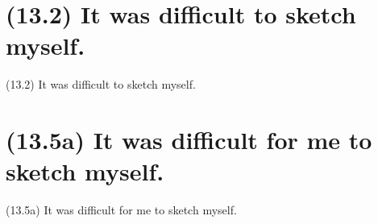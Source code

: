 \documentclass{article}
\begin{document}
\clearpage

%
%

\section*{(13.2) It was difficult to sketch myself.}

\bigbreak
\begin{enumerate*}
\item[(13.2)] It was difficult to sketch myself.
\end{enumerate*}
\bigbreak

\bigbreak
\begin{minipage}{\textwidth}
\end{minipage}
\bigbreak

\clearpage

%
%

\section*{(13.5a) It was difficult for me to sketch myself.}

\bigbreak
\begin{enumerate*}
\item[(13.5a)] It was difficult for me to sketch myself.
\end{enumerate*}
\bigbreak
\end{document}

